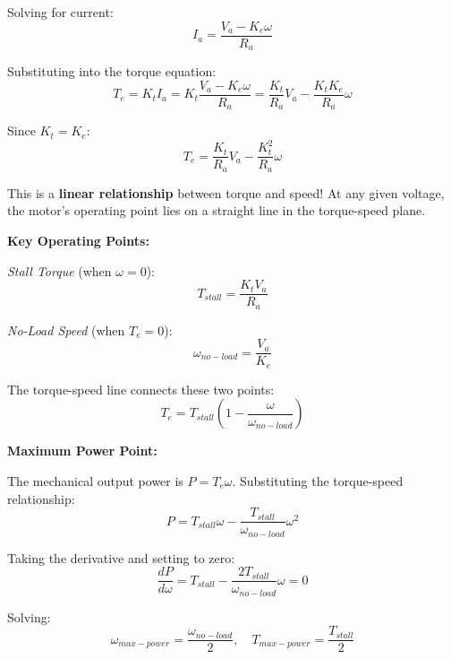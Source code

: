 Solving for current:
\begin{equation}
    I_a = \frac{V_a - K_e \omega}{R_a}
\end{equation}

Substituting into the torque equation:
\begin{equation}
    T_e = K_t I_a = K_t \frac{V_a - K_e \omega}{R_a} = \frac{K_t}{R_a} V_a - \frac{K_t K_e}{R_a} \omega
\end{equation}

Since $K_t = K_e$:
\begin{equation}
    \boxed{T_e = \frac{K_t}{R_a} V_a - \frac{K_t^2}{R_a} \omega}
    \label{eq:torque_speed}
\end{equation}

This is a \textbf{linear relationship} between torque and speed! At any given voltage, the motor's operating point lies on a straight line in the torque-speed plane.

\textbf{Key Operating Points:}

\textit{Stall Torque} (when $\omega = 0$):
\begin{equation}
    T_{stall} = \frac{K_t V_a}{R_a}
\end{equation}

\textit{No-Load Speed} (when $T_e = 0$):
\begin{equation}
    \omega_{no-load} = \frac{V_a}{K_e}
\end{equation}

The torque-speed line connects these two points:
\begin{equation}
    T_e = T_{stall} \left(1 - \frac{\omega}{\omega_{no-load}}\right)
\end{equation}

\textbf{Maximum Power Point:}

The mechanical output power is $P = T_e \omega$. Substituting the torque-speed relationship:
\begin{equation}
    P = T_{stall} \omega - \frac{T_{stall}}{\omega_{no-load}} \omega^2
\end{equation}

Taking the derivative and setting to zero:
\begin{equation}
    \frac{dP}{d\omega} = T_{stall} - \frac{2 T_{stall}}{\omega_{no-load}} \omega = 0
\end{equation}

Solving:
\begin{equation}
    \omega_{max-power} = \frac{\omega_{no-load}}{2}, \quad T_{max-power} = \frac{T_{stall}}{2}
\end{equation}

